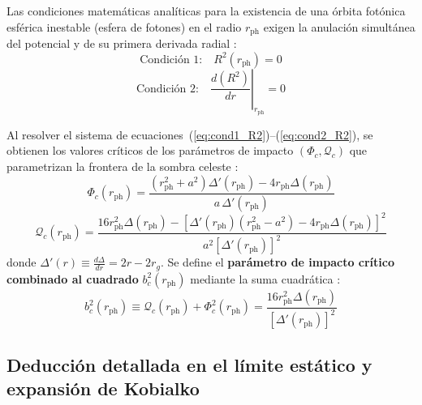 Las condiciones matemáticas analíticas para la existencia de una órbita fotónica esférica inestable (esfera de fotones) en el radio $r_{\mathrm{ph}}$ exigen la anulación simultánea del potencial y de su primera derivada radial \citep{prueba_bh_cargado, dinamica_de_photones_bh_cargado, perturbaciones_en_bh}:
\begin{equation}
    \text{Condición 1:} \quad R^2(r_{\mathrm{ph}}) = 0
    \label{eq:cond1_R2}
\end{equation}
\begin{equation}
    \text{Condición 2:} \quad \left. \frac{d(R^2)}{dr} \right|_{r_{\mathrm{ph}}} = 0
    \label{eq:cond2_R2}
\end{equation}

Al resolver el sistema de ecuaciones~(\ref{eq:cond1_R2})--(\ref{eq:cond2_R2}), se obtienen los valores críticos de los parámetros de impacto $(\Phi_c, \mathcal{Q}_c)$ que parametrizan la frontera de la sombra celeste \citep{1403.5234v2, Grenzebach2014}:
\begin{equation}
    \Phi_c(r_{\mathrm{ph}}) = \frac{(r_{\mathrm{ph}}^2 + a^2) \Delta'(r_{\mathrm{ph}}) - 4 r_{\mathrm{ph}} \Delta(r_{\mathrm{ph}})}{a \, \Delta'(r_{\mathrm{ph}})}
    \label{eq:Phi_critico}
\end{equation}
\begin{equation}
    \mathcal{Q}_c(r_{\mathrm{ph}}) = \frac{16 r_{\mathrm{ph}}^2 \Delta(r_{\mathrm{ph}}) - \left[ \Delta'(r_{\mathrm{ph}}) (r_{\mathrm{ph}}^2 - a^2) - 4 r_{\mathrm{ph}} \Delta(r_{\mathrm{ph}}) \right]^2}{a^2 [\Delta'(r_{\mathrm{ph}})]^2}
    \label{eq:Q_critico}
\end{equation}
donde $\Delta'(r) \equiv \frac{d\Delta}{dr} = 2r - 2r_g$. Se define el \textbf{parámetro de impacto crítico combinado al cuadrado} $b_c^2(r_{\mathrm{ph}})$ mediante la suma cuadrática \citep{perturbaciones_en_bh, Kobialko2024}:
\begin{equation}
    b_c^2(r_{\mathrm{ph}}) \equiv \mathcal{Q}_c(r_{\mathrm{ph}}) + \Phi_c^2(r_{\mathrm{ph}}) = \frac{16 r_{\mathrm{ph}}^2 \Delta(r_{\mathrm{ph}})}{[\Delta'(r_{\mathrm{ph}})]^2}
    \label{eq:bc2_combinado_def}
\end{equation}

\subsection{Deducción detallada en el límite estático y expansión de Kobialko}


